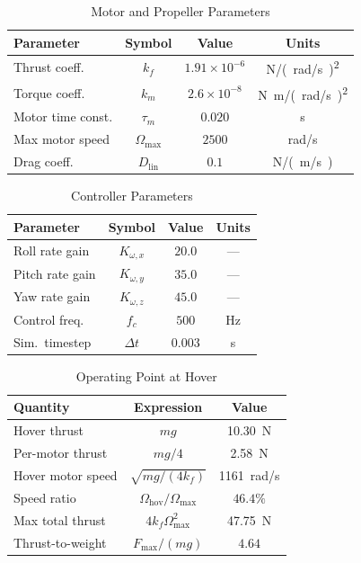 \documentclass[journal]{IEEEtran}
\begin{document}
\begin{table}[!t]
  \centering
  \caption{Motor and Propeller Parameters}
  \label{tab:params_motor}
  \begin{tabular}{@{}lccc@{}}
    \toprule
    Parameter & Symbol & Value & Units \\
    \midrule
    Thrust coeff. & $k_f$ & $1.91 \times 10^{-6}$ & \si{N/(rad/s)^2} \\
    Torque coeff. & $k_m$ & $2.6 \times 10^{-8}$ & \si{N.m/(rad/s)^2} \\
    Motor time const. & $\tau_m$ & $0.020$ & \si{s} \\
    Max motor speed & $\Omega_{\max}$ & $2500$ & \si{rad/s} \\
    Drag coeff. & $D_{\text{lin}}$ & $0.1$ & \si{N/(m/s)} \\
    \bottomrule
  \end{tabular}
\end{table}

\begin{table}[!t]
  \centering
  \caption{Controller Parameters}
  \label{tab:params_ctrl}
  \begin{tabular}{@{}lccc@{}}
    \toprule
    Parameter & Symbol & Value & Units \\
    \midrule
    Roll rate gain & $K_{\omega,x}$ & $20.0$ & --- \\
    Pitch rate gain & $K_{\omega,y}$ & $35.0$ & --- \\
    Yaw rate gain & $K_{\omega,z}$ & $45.0$ & --- \\
    Control freq. & $f_c$ & $500$ & \si{Hz} \\
    Sim.\ timestep & $\Delta t$ & $0.003$ & \si{s} \\
    \bottomrule
  \end{tabular}
\end{table}

\begin{table}[!t]
  \centering
  \caption{Operating Point at Hover}
  \label{tab:params_hover}
  \begin{tabular}{@{}lcc@{}}
    \toprule
    Quantity & Expression & Value \\
    \midrule
    Hover thrust & $mg$ & \SI{10.30}{N} \\
    Per-motor thrust & $mg/4$ & \SI{2.58}{N} \\
    Hover motor speed & $\sqrt{mg/(4k_f)}$ & \SI{1161}{rad/s} \\
    Speed ratio & $\Omega_\text{hov}/\Omega_{\max}$ & $46.4\%$ \\
    Max total thrust & $4 k_f \Omega_{\max}^2$ & \SI{47.75}{N} \\
    Thrust-to-weight & $F_{\max}/(mg)$ & $4.64$ \\
    \bottomrule
  \end{tabular}
\end{table}
\end{document}
